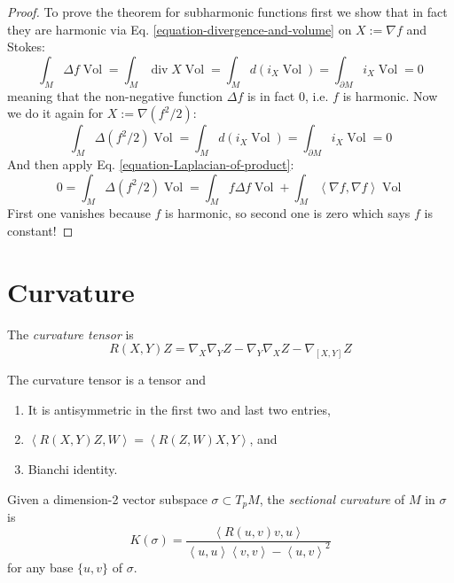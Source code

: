 \begin{proof}
To prove the theorem for subharmonic functions first we show that in fact they
are harmonic via Eq. \ref{equation-divergence-and-volume} 
on $X:= \nabla f$ and Stokes:
$$
\int_M \Delta f \operatorname{Vol}=\int_M \operatorname{div}X \operatorname{Vol}
=\int_M d(i_X \operatorname{Vol})=\int_{\partial M}i_X \operatorname{Vol}=0
$$
meaning that the non-negative function $\Delta f$ is in fact 0, i.e. $f$ is
harmonic. Now we do it again for $X:=\nabla(f^2/2)$:
$$
\int_M \Delta(f^2/2)\operatorname{Vol}
=\int_M d(i_X \operatorname{Vol})
=\int_{\partial M}i_X \operatorname{Vol}
=0
$$
And then apply Eq. \ref{equation-Laplacian-of-product}:
$$
0=\int_M \Delta(f^2/2)\operatorname{Vol}
=\int_M f \Delta f \operatorname{Vol}
+\int_M \left<\nabla f,\nabla f\right>\operatorname{Vol}
$$
First one vanishes because $f$ is harmonic, so second one is zero which says
 $f$ is constant!
\end{proof}

\section{Curvature}
\label{section-curvature}

The {\it curvature tensor} is
\begin{equation}
\label{equation-curvature-tensor}
R(X,Y)Z=\nabla_X\nabla_YZ-\nabla_Y\nabla_XZ-\nabla_{[X,Y]}Z
\end{equation}

\begin{proposition}
\label{proposition-symmetries-of-curvature-tensor}
The curvature tensor is a tensor and
\begin{enumerate}
\item It is antisymmetric in the first two and last two entries,
\item $\left<R(X,Y)Z,W\right>=\left<R(Z,W)X,Y\right>$, and
\item Bianchi identity.
\end{enumerate}
\end{proposition}

Given a dimension-2 vector subspace $\sigma\subset T_pM$, the {\it sectional
curvature} of $M$ in $\sigma$ is
\begin{equation}
\label{equation-sectional-curvature}
K(\sigma)=\frac{\left<R(u,v)v,u\right>}
{\left<u,u\right>\left<v,v\right>-\left<u,v\right>^2}
\end{equation}
for any base $\{u,v\}$ of $\sigma$.

